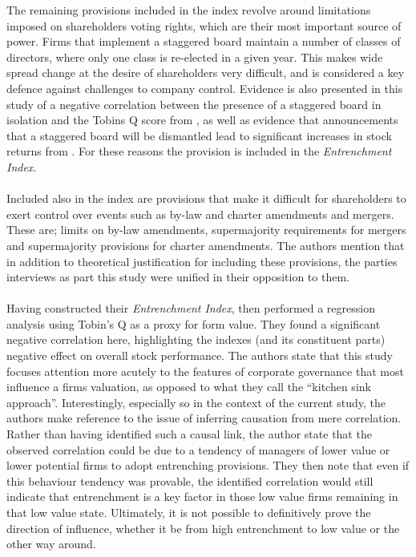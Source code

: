 {{The remaining provisions included in the index revolve around limitations imposed on shareholders voting rights, which are their most important source of power. Firms that implement a staggered board maintain a number of classes of directors, where only one class is re-elected in a given year. This makes wide spread change at the desire of shareholders very difficult, and is considered a key defence against challenges to company control. Evidence is also presented in this study of a negative correlation between the presence of a staggered board in isolation and the Tobins Q score from \cite{bebchukTheCosts}, as well as evidence that announcements that a staggered board will be dismantled lead to significant increases in stock returns from  \cite{guoUndoing}. For these reasons the provision is included in the {\it Entrenchment Index}.\\\\
Included also in the index are provisions that make it difficult for shareholders to exert control over events such as by-law and charter amendments and mergers. These are; limits on by-law amendments, supermajority requirements for mergers and supermajority provisions for charter amendments. The authors mention that in addition to theoretical justification for including these provisions, the parties interviews as part this study were unified in their opposition to them. \\\\
Having constructed their {\it Entrenchment Index}, \cite{bebchukWhatMatters} then performed a regression analysis using Tobin's Q as a proxy for form value. They found a significant negative correlation here, highlighting the indexes (and its constituent parts) negative effect on overall stock performance. The authors state that this study focuses attention more acutely to the features of corporate governance that most influence a firms valuation, as opposed to what they call the ``kitchen sink approach''. Interestingly, especially so in the context of the current study, the authors make reference to the issue of inferring causation from mere correlation. Rather than having identified such a causal link, the author state that the observed correlation could be due to a tendency of managers of lower value or lower potential firms to adopt entrenching provisions. They then note that even if this behaviour tendency was provable, the identified correlation would still indicate that entrenchment is a key factor in those low value firms remaining in that low value state. Ultimately, it is not possible to definitively prove the direction of influence, whether it be from high entrenchment to low value or the other way around. }
}
